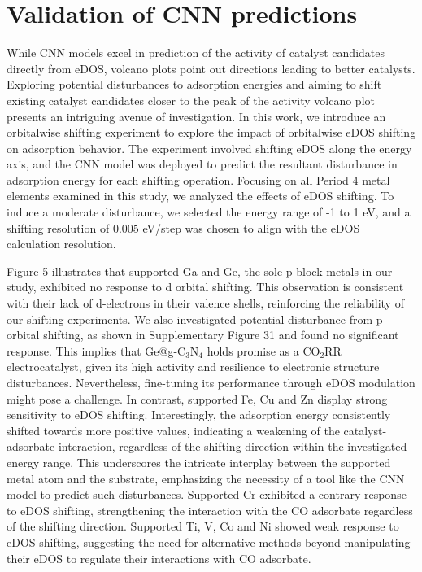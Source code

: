 

\section{Validation of CNN predictions}
While CNN models excel in prediction of the activity of catalyst candidates directly from eDOS, volcano plots point out directions leading to better catalysts.
Exploring potential disturbances to adsorption energies and aiming to shift existing catalyst candidates closer to the peak of the activity volcano plot presents an intriguing avenue of investigation.
In this work, we introduce an orbitalwise shifting experiment to explore the impact of orbitalwise eDOS shifting on adsorption behavior.
The experiment involved shifting eDOS along the energy axis, and the CNN model was deployed to predict the resultant disturbance in adsorption energy for each shifting operation.
Focusing on all Period 4 metal elements examined in this study, we analyzed the effects of eDOS shifting.
To induce a moderate disturbance, we selected the energy range of -1 to 1 eV, and a shifting resolution of 0.005 eV/step was chosen to align with the eDOS calculation resolution.

Figure 5 illustrates that supported Ga and Ge, the sole p-block metals in our study, exhibited no response to d orbital shifting.
This observation is consistent with their lack of d-electrons in their valence shells, reinforcing the reliability of our shifting experiments.
We also investigated potential disturbance from p orbital shifting, as shown in Supplementary Figure 31 and found no significant response.
This implies that Ge@g-C$_3$N$_4$ holds promise as a CO$_2$RR electrocatalyst, given its high activity and resilience to electronic structure disturbances.
Nevertheless, fine-tuning its performance through eDOS modulation might pose a challenge.
In contrast, supported Fe, Cu and Zn display strong sensitivity to eDOS shifting.
Interestingly, the adsorption energy consistently shifted towards more positive values, indicating a weakening of the catalyst-adsorbate interaction, regardless of the shifting direction within the investigated energy range.
This underscores the intricate interplay between the supported metal atom and the substrate, emphasizing the necessity of a tool like the CNN model to predict such disturbances.
Supported Cr exhibited a contrary response to eDOS shifting, strengthening the interaction with the CO adsorbate regardless of the shifting direction.
Supported Ti, V, Co and Ni showed weak response to eDOS shifting, suggesting the need for alternative methods beyond manipulating their eDOS to regulate their interactions with CO adsorbate.

